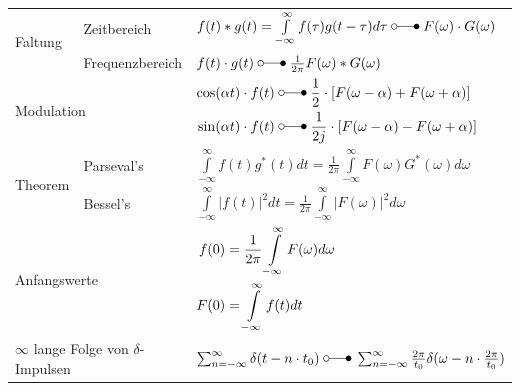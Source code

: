 \begin{tabular}{|p{3cm}|p{6.5cm}p{9cm}|}
   		\hline
   		\hline
	   		\multirow{2}{*}{Faltung} & Zeitbereich & $f(t) \ast g(t) = \int\limits_{-\infty}^{\infty} f(\tau)g(t-\tau)d\tau \; \laplace \;
	   		F(\omega) \cdot G(\omega)$ \\ 
	   		\cline{2-3} 
	   		& Frequenzbereich & $f(t) \cdot g(t) \; \laplace \; \frac{1}{2\pi}F(\omega) \ast G(\omega)$ \\ 
   		\hline
   		\hline
   			\multicolumn{2}{|l}{Modulation} & 
   				\begin{math}
   					\begin{aligned}
	   					\cos(\alpha t) \cdot f(t)  \; &\laplace \;  \frac{1}{2}\cdot
	   					\left[F(\omega-\alpha) + F(\omega+\alpha)\right]\\
	   					\sin(\alpha t) \cdot f(t) \; &\laplace \; \frac{1}{2j}\cdot \left[F(\omega-\alpha) - F(\omega+\alpha)\right]
   					\end{aligned}
   				\end{math}	\\ 
   		\hline
   		\hline
   			\multirow{2}{*}{Theorem} & Parseval's & 			 			$\int\limits_{-\infty}^{\infty}f(t)g^{\ast}(t)dt = \frac{1}{2\pi}
   			\int\limits_{-\infty}^{\infty}F(\omega)G^{\ast}(\omega)d\omega$\\ 
   			\cline{2-3} 
   			& Bessel's & $\int\limits_{-\infty}^{\infty}|f(t)|^2 dt = \frac{1}{2\pi}
   			\int\limits_{-\infty}^{\infty}|F(\omega)|^2 d\omega$ \\ 
   		\hline
   		\hline
		   	\multicolumn{2}{|l}{Anfangswerte} & 
		   	\begin{math}
			   	\begin{aligned}
				   	f(0)&=\frac{1}{2\pi}\int\limits_{-\infty}^{\infty}F(\omega)d\omega
				   	\hspace*{1cm}\\
				   	F(0)&=\int\limits_{-\infty}^{\infty}f(t)dt
			   	\end{aligned}
		   	\end{math} \\
		\hline
		\hline
		   	\multicolumn{2}{|l}{$\infty$ lange Folge von $\delta$-Impulsen} & $\sum_{n=-\infty}^{\infty} \delta(t-n\cdot t_0) \; \laplace \;
		   	\sum_{n=-\infty}^{\infty} \frac{2\pi}{t_0}\delta(\omega-n\cdot
		   	\frac{2\pi}{t_0})$ \\ 
		\hline
	\end{tabular}




